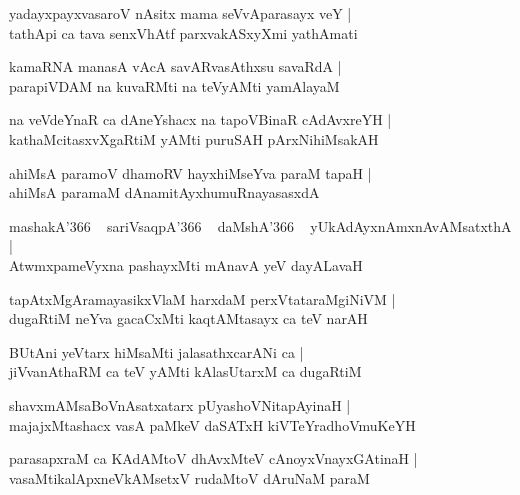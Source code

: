 \documentclass[twoside,12pt,openright]{book}
\newcounter{shloka}[chapter]
\begin{document}
\begin{shloka}
yadayxpayxvasaroV nAsitx mama seVvAparasayx veY |\\
tathApi ca tava senxVhAtf parxvakASxyXmi yathAmati 
\end{shloka}

\begin{shloka}
kamaRNA manasA vAcA savARvasAthxsu savaRdA |\\
parapiVDAM na kuvaRMti na teVyAMti yamAlayaM 
\end{shloka}

\begin{shloka}
na veVdeYnaR ca dAneYshacx na tapoVBinaR cAdAvxreYH |\\
kathaMcitasxvXgaRtiM yAMti puruSAH pArxNihiMsakAH 
\end{shloka}

\begin{shloka}
ahiMsA paramoV dhamoRV hayxhiMseYva paraM tapaH |\\
ahiMsA paramaM dAnamitAyxhumuRnayasasxdA 
\end{shloka}

\begin{shloka}
mashakA\char'366 ~ sariVsaqpA\char'366 ~ daMshA\char'366 ~ yUkAdAyxnAmxnAvAMsatxthA |\\
AtwmxpameVyxna pashayxMti mAnavA yeV dayALavaH 
\end{shloka}

\begin{shloka}
tapAtxMgAramayasikxVlaM harxdaM perxVtataraMgiNiVM  |\\
dugaRtiM neYva gacaCxMti kaqtAMtasayx ca teV narAH 
\end{shloka}

\begin{shloka}
BUtAni yeVtarx hiMsaMti jalasathxcarANi ca |\\
jiVvanAthaRM ca teV  yAMti kAlasUtarxM ca dugaRtiM 
\end{shloka}

\begin{shloka}
shavxmAMsaBoVnAsatxatarx pUyashoVNitapAyinaH |\\
majajxMtashacx vasA paMkeV daSATxH kiVTeYradhoVmuKeYH 
\end{shloka}

\begin{shloka}
parasapxraM ca KAdAMtoV dhAvxMteV cAnoyxVnayxGAtinaH |\\
vasaMtikalApxneVkAMsetxV rudaMtoV dAruNaM paraM 
\end{shloka}
\end{document}
